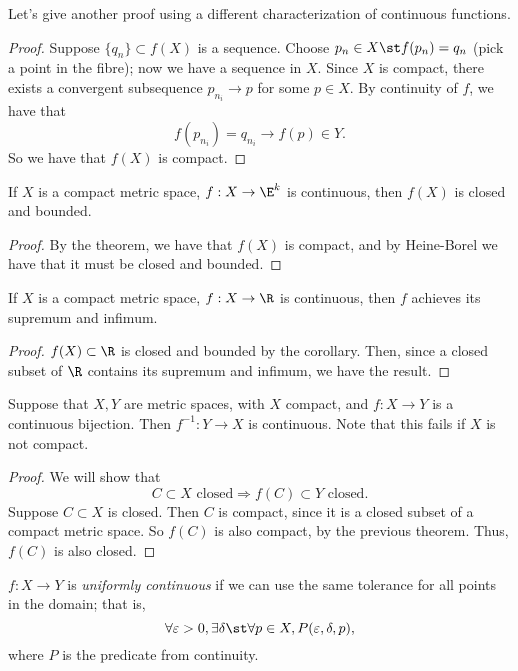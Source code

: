 \documentclass{notes}
\begin{document}
Let's give another proof using a different characterization of continuous functions.
\begin{proof}
  Suppose $\{q_n\} \subset f(X)$ is a sequence. Choose $p_n \in X \st f(p_n) = q_n$ (pick a point in
  the fibre); now we have a sequence in $X$. Since $X$ is compact, there exists a convergent
  subsequence $p_{n_i} \to p$ for some $p\in X$. By continuity of $f$, we have that 
  $$f(p_{n_i}) = q_{n_i} \to f(p) \in Y.$$ So we have that $f(X)$ is compact.
\end{proof}

\begin{corollary}
  If $X$ is a compact metric space, $f: X \to \E^k$ is continuous, then $f(X)$ is closed and
  bounded.
\end{corollary}
\begin{proof}
  By the theorem, we have that $f(X)$ is compact, and by Heine-Borel we have that it must be closed
  and bounded.
\end{proof}

\begin{corollary}
  If $X$ is a compact metric space, $f:X \to \R$ is continuous, then $f$ achieves its supremum and
  infimum.
\end{corollary}
\begin{proof}
  $f(X) \subset \R$ is closed and bounded by the corollary. Then, since a closed subset of $\R$
  contains its supremum and infimum, we have the result.
\end{proof}

\begin{theorem}
  Suppose that $X,Y$ are metric spaces, with $X$ compact, and $f:X\to Y$ is a continuous bijection.
  Then $f^{-1}: Y\to X$ is continuous. Note that this fails if $X$ is not compact.
\end{theorem}
\begin{proof}
  We will show that $$C \subset X \text{ closed} \Rightarrow f(C) \subset Y \text{ closed.}$$
  Suppose $C\subset X$ is closed. Then $C$ is compact, since it is a closed subset of a compact
  metric space. So $f(C)$ is also compact, by the previous theorem. Thus, $f(C)$ is also closed.  
\end{proof}

\begin{defn}[Uniformity]
  $f: X \to Y$ is \emph{uniformly continuous} if we can use the same tolerance for all points in the domain;
  that is, $$\forall \varepsilon > 0, \exists \delta \st \forall p\in X, P(\varepsilon, \delta,
  p),$$ where $P$ is the predicate from continuity.
\end{defn}
\end{document}
